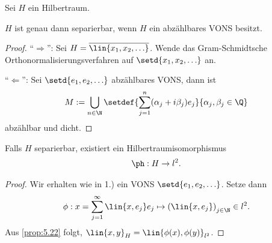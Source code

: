 \begin{bem}[Bemerkungen.]
\label{bem:5.25}
Sei $H$ ein Hilbertraum.
\begin{bemenum}
  \item $H$ ist genau dann separierbar, wenn $H$ ein abzählbares VONS besitzt.
\begin{proof}
``$\Rightarrow$'': Sei $H=\overline{\lin{x_1,x_2,\ldots}}$. Wende das
Gram-Schmidtsche Orthonormalisierungsverfahren auf $\setd{x_1,x_2,\ldots}$ an.

``$\Leftarrow$'': Sei $\setd{e_1,e_2,\ldots}$ abzählbares VONS, dann ist
\begin{align*}
M := \bigcup_{n\in\N} \setdef{\sum\limits_{j=1}^n (\alpha_j + i
\beta_j)e_j}{\alpha_j,\beta_j\in\Q}
\end{align*}
abzählbar und dicht.\qedhere 
\end{proof}
  \item Falls $H$ separierbar, existiert ein Hilbertraumisomorphismus
\begin{align*}
\ph: H\to l^2.
\end{align*}
\begin{proof}
Wir erhalten wie in 1.) ein VONS $\setd{e_1,e_2,\ldots}$. Setze dann
\begin{align*}
\phi: x=\sum\limits_{j=1}^\infty \lin{x,e_j}e_j \mapsto
\left(\lin{x,e_j}\right)_{j\in\N} \in l^2.
\end{align*}
Aus \ref{prop:5.22} folgt, $\lin{x,y}_H =
\lin{\phi(x),\phi(y)}_{l^2}$.\qedhere\maphere
\end{proof}
\end{bemenum}
\end{bem}